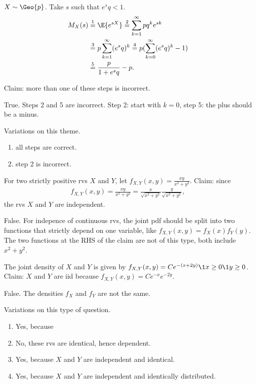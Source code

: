 \documentclass[tf-tutorial-all.tex]{subfiles}
\begin{document}
\begin{truefalse}
$X\sim \Geo{p}$. Take $s$ such that $e^{s}q < 1$.
\begin{align}
\label{eq:5}
M_{X}(s)
  &\stackrel{1}= \E{e^{sX}} \stackrel{2}= \sum_{k=1}^{\infty} p q^{k} e^{sk} \\
  &\stackrel{3}= p \sum_{k=1}^{\infty} (e^{s}q)^{k}
  \stackrel{4}= p (\sum_{k=0}^{\infty} (e^{s}q)^{k}-1) \\
&  \stackrel{5}= \frac p {1+e^{s}q}  - p.
\end{align}

Claim: more than one of these steps is incorrect.
\begin{solution}
True. Steps 2 and 5 are incorrect. Step 2: start with $k=0$, step 5: the plus should be a minus.

Variations on this theme.
\begin{enumerate}
\item all steps are correct.
\item step 2 is incorrect.
\end{enumerate}
\end{solution}
\end{truefalse}


\begin{truefalse}
For two strictly positive rvs $X$ and $Y$, let $f_{X,Y}(x, y) = \frac{xy}{x^{2}+y^2}$. Claim: since
\begin{align*}
  f_{X,Y}(x, y) = \frac{xy}{x^{2}+y^2} = \frac{x}{\sqrt{x^{2}+y^2}} \frac{y}{\sqrt{x^{2}+y^2}},
\end{align*}
the rvs $X$ and $Y$ are independent.
\begin{solution}
False.
For indepence of continuous rvs, the joint pdf should be split into two functions that strictly depend on one variable, like $f_{X,Y}(x,y) = f_{X}(x) f_{Y}(y)$.
The two functions at the RHS of the claim are not of this type, both include $x^{2}+y^{2}$.
\end{solution}
\end{truefalse}


\begin{truefalse}
The joint density of $X$ and $Y$ is given by $f_{X,Y}(x,y) = Ce^{-(x + 2y)}\1{x\geq 0}\1{y\geq 0}$.
Claim:  $X$ and $Y$ are iid because  $f_{X,Y}(x, y) = C e^{-x}e^{-2y}$.
\begin{solution}
False. The densities  $f_{X}$ and $f_{Y}$ are not the same.

Variations on this type of question.
\begin{enumerate}
\item Yes, because
\item No,  these rvs are identical, hence dependent.
\item Yes, because $X$ and $Y$ are independent and identical.
\item Yes, because $X$ and $Y$ are independent and identically distributed.
\end{enumerate}
\end{solution}
\end{truefalse}
\end{document}
